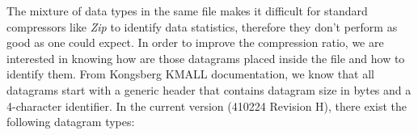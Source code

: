 The mixture of data types in the same file makes it difficult for standard compressors like \textit{Zip} to identify data statistics, therefore they don't perform as good as one could expect. In order to improve the compression ratio, we are interested in knowing how are those datagrams placed inside the file and how to identify them. From Kongsberg KMALL documentation, we know that all datagrams start with a generic header that contains datagram size in bytes and a 4-character identifier. In the current version (410224 Revision H), there exist the following datagram types:

\begin{table}[h!]
\footnotesize
\begin{center}
\end{center}
\caption{Installation and runtime datagrams of the KMALL format.}
\end{table}

